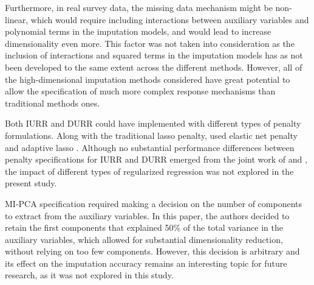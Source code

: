 	Furthermore, in real survey data, the missing data mechanism might be non-linear, which would require
	including interactions between auxiliary variables and polynomial terms in the imputation models,
	and would lead to increase dimensionality even more.
	This factor was not taken into consideration as the inclusion of interactions and squared terms in the 
	imputation models has as not been developed to the same extent across the different methods.
	However, all of the high-dimensional imputation methods considered have great potential to allow the 
	specification of much more complex response mechanisms than traditional methods ones.

	Both IURR and DURR could have implemented with different types of penalty formulations.
	Along with the traditional lasso penalty, \cite{zhaoLong:2016} used elastic net penalty \citep{zouHastie:2005} 
	and adaptive lasso \citep{zou:2006}.
	Although no substantial performance differences between penalty specifications for IURR and DURR emerged 
	from the joint work of \cite{zhaoLong:2016} and \cite{dengEtAl:2016}, the impact of different types of 
	regularized regression was not explored in the present study. 

	MI-PCA specification required making a decision on the number of components to extract from the auxiliary 
	variables.
	In this paper, the authors decided to retain the first components that explained 50\% of the 
	total variance in the auxiliary variables, which allowed for substantial dimensionality reduction, 
	without relying on too few components.
	However, this decision is arbitrary and its effect on the imputation accuracy remains an interesting 
	topic for future research, as it was not explored in this study.

